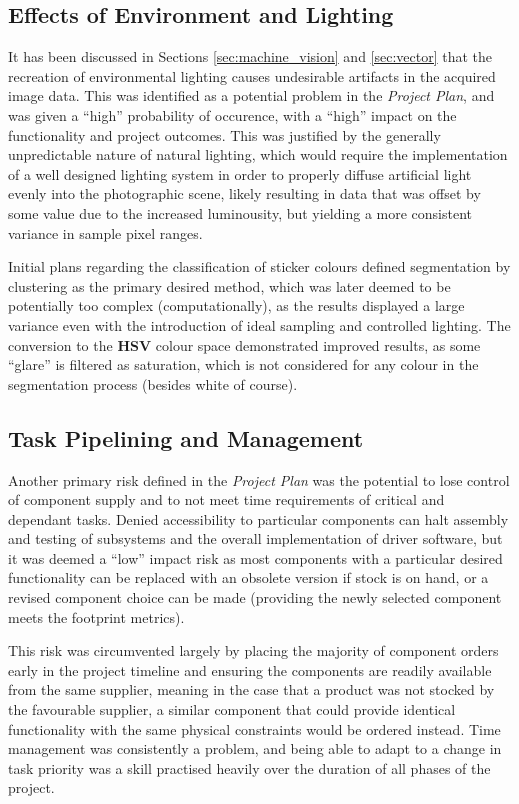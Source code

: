 \documentclass[11pt, a4paper, oneside]{Thesis} %
\begin{document}
\subsection{Effects of Environment and Lighting}
It has been discussed in Sections \ref{sec:machine_vision} and \ref{sec:vector} that the recreation of environmental lighting causes undesirable artifacts in the acquired image data. This was identified as a potential problem in the \emph{Project Plan}, and was given a ``high'' probability of occurence, with a ``high'' impact on the functionality and project outcomes. This was justified by the generally unpredictable nature of natural lighting, which would require the implementation of a well designed lighting system in order to properly diffuse artificial light evenly into the photographic scene, likely resulting in data that was offset by some value due to the increased luminousity, but yielding a more consistent variance in sample pixel ranges.

Initial plans regarding the classification of sticker colours defined segmentation by clustering as the primary desired method, which was later deemed to be potentially too complex (computationally), as the results displayed a large variance even with the introduction of ideal sampling and controlled lighting. The conversion to the \textbf{HSV} colour space demonstrated improved results, as some ``glare'' is filtered as saturation, which is not considered for any colour in the segmentation process (besides white of course).
   
\subsection{Task Pipelining and Management}
Another primary risk defined in the \emph{Project Plan} was the potential to lose control of component supply and to not meet time requirements of critical and dependant tasks. Denied accessibility to particular components can halt assembly and testing of subsystems and the overall implementation of driver software, but it was deemed a ``low'' impact risk as most components with a particular desired functionality can be replaced with an obsolete version if stock is on hand, or a revised component choice can be made (providing the newly selected component meets the footprint metrics).

This risk was circumvented largely by placing the majority of component orders early in the project timeline and ensuring the components are readily available from the same supplier, meaning in the case that a product was not stocked by the favourable supplier, a similar component that could provide identical functionality with the same physical constraints would be ordered instead. Time management was consistently a problem, and being able to adapt to a change in task priority was a skill practised heavily over the duration of all phases of the project.
  
\end{document}
